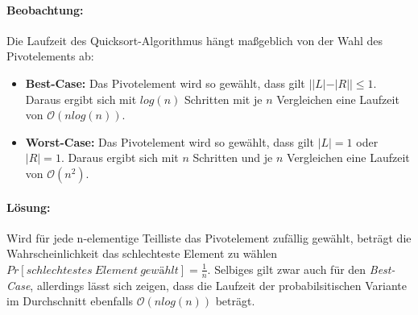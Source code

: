 \paragraph{Beobachtung:}
Die Laufzeit des Quicksort-Algorithmus hängt maßgeblich von der Wahl des Pivotelements ab:
\begin{itemize}
	\item \textbf{Best-Case:} Das Pivotelement wird so gewählt, dass gilt $||L| - |R| | \leq 1$. Daraus ergibt sich mit $log(n)$ Schritten mit je $n$ Vergleichen eine Laufzeit von $\mathcal{O}(nlog(n))$.
	\item \textbf{Worst-Case:} Das Pivotelement wird so gewählt, dass gilt $|L| = 1$ oder $|R| = 1$. Daraus ergibt sich mit $n$ Schritten und je $n$ Vergleichen eine Laufzeit von $\mathcal{O}(n^2)$.
\end{itemize}


\paragraph{Lösung:}
Wird für jede n-elementige Teilliste das Pivotelement zufällig gewählt, beträgt die Wahrscheinlichkeit das schlechteste Element zu wählen $Pr[schlechtestes\ Element\ gewählt] = \frac{1}{n}$.
Selbiges gilt zwar auch für den \emph{Best-Case}, allerdings lässt sich zeigen, dass die Laufzeit der probabilsitischen Variante im Durchschnitt ebenfalls $\mathcal{O}(nlog(n))$ beträgt. \cite{knuth}








